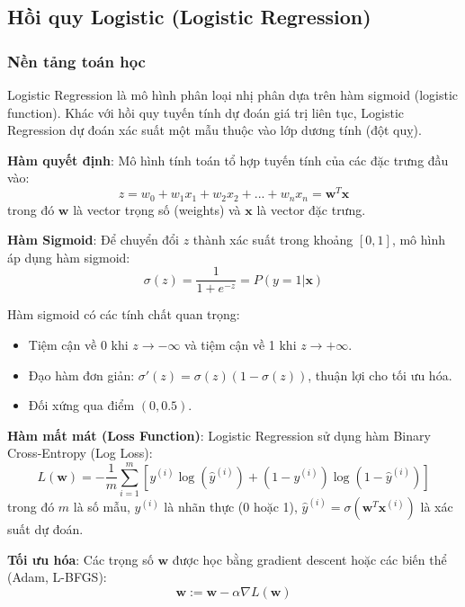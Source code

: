 ﻿\documentclass{article}
\begin{document}
\subsection{Hồi quy Logistic (Logistic Regression)}

\subsubsection*{Nền tảng toán học}
Logistic Regression là mô hình phân loại nhị phân dựa trên hàm sigmoid (logistic function). Khác với hồi quy tuyến tính dự đoán giá trị liên tục, Logistic Regression dự đoán xác suất một mẫu thuộc vào lớp dương tính (đột quỵ).

\textbf{Hàm quyết định}: Mô hình tính toán tổ hợp tuyến tính của các đặc trưng đầu vào:
\begin{equation}
z = w_0 + w_1x_1 + w_2x_2 + ... + w_nx_n = \mathbf{w}^T\mathbf{x}
\end{equation}
trong đó $\mathbf{w}$ là vector trọng số (weights) và $\mathbf{x}$ là vector đặc trưng.

\textbf{Hàm Sigmoid}: Để chuyển đổi $z$ thành xác suất trong khoảng $[0, 1]$, mô hình áp dụng hàm sigmoid:
\begin{equation}
\sigma(z) = \frac{1}{1 + e^{-z}} = P(y=1|\mathbf{x})
\end{equation}

Hàm sigmoid có các tính chất quan trọng:
\begin{itemize}
    \item Tiệm cận về 0 khi $z \to -\infty$ và tiệm cận về 1 khi $z \to +\infty$.
    \item Đạo hàm đơn giản: $\sigma'(z) = \sigma(z)(1-\sigma(z))$, thuận lợi cho tối ưu hóa.
    \item Đối xứng qua điểm $(0, 0.5)$.
\end{itemize}

\textbf{Hàm mất mát (Loss Function)}: Logistic Regression sử dụng hàm Binary Cross-Entropy (Log Loss):
\begin{equation}
L(\mathbf{w}) = -\frac{1}{m}\sum_{i=1}^{m}\left[y^{(i)}\log(\hat{y}^{(i)}) + (1-y^{(i)})\log(1-\hat{y}^{(i)})\right]
\end{equation}
trong đó $m$ là số mẫu, $y^{(i)}$ là nhãn thực (0 hoặc 1), $\hat{y}^{(i)} = \sigma(\mathbf{w}^T\mathbf{x}^{(i)})$ là xác suất dự đoán.

\textbf{Tối ưu hóa}: Các trọng số $\mathbf{w}$ được học bằng gradient descent hoặc các biến thể (Adam, L-BFGS):
\begin{equation}
\mathbf{w} := \mathbf{w} - \alpha \nabla L(\mathbf{w})
\end{equation}
\end{document}
